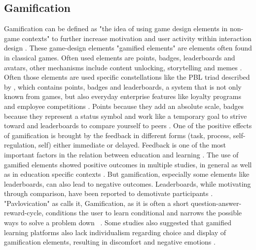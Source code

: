 \subsection{Gamification}
Gamification can be defined as "the idea of using game design elements in non-game contexts" \>\parencite{deterdingGameDesignElements2011} to further increase motivation and user activity within interaction design \parencite{deterdingGameDesignElements2011}.
These game-design elements "gamified elements" are elements often found in classical games. Often used elements are points, badges, leaderboards and avatars, other mechanisms include content unlocking, storytelling and memes \parencite{zainuddinImpactGamificationLearning2020}.
Often those elements are used specific constellations like the PBL triad described by \cite{werbachWinHowGame2012}, which contains points, badges and leaderboards, a system that is not only known from games, but also everyday enterprise features like loyalty programs and employee competitions \parencite{werbachWinHowGame2012}.
Points because they add an absolute scale, badges because they represent a status symbol and work like a temporary goal to strive toward and leaderboards to compare yourself to peers \parencite{werbachWinHowGame2012}.
One of the positive effects of gamification is brought by the feedback in different forms (task, process, self-regulation, self) either immediate or delayed. Feedback is one of the most important factors in the relation between education and learning \cite{sailerGamificationLearningMetaanalysis2020}.
The use of gamified elements showed positive outcomes in multiple studies, in general \parencite{hamariDoesGamificationWork2014} as well as in education specific contexts \parencite{sailerGamificationLearningMetaanalysis2020}.
But gamification, especially some elements like leaderboards, can also lead to negative outcomes. Leaderboards, while motivating through comparison, have been reported to demotivate participants \parencite{almeidaSystematicMappingNegative2021}.
"Pavlovication" as \cite{klabbersArchitectureGameScience2018} calls it, Gamification, as it is often a short question-answer-reward-cycle, conditions the user to learn conditional and narrows the possible ways to solve a problem down ~\parencite{klabbersArchitectureGameScience2018}.
Some studies also suggested that gamified learning platforms also lack individualism regarding choice and display of gamification elements, resulting in discomfort and negative emotions \parencite{santosDoesGenderStereotype2023}.

